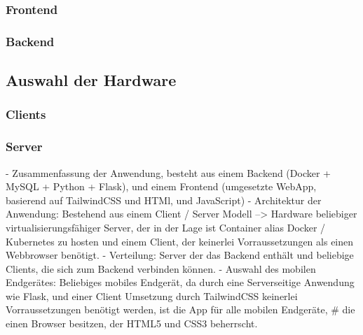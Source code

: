 \subsubsection{Frontend}
\label{sec:frontend}
\subsubsection{Backend}
\label{sec:backend}

\subsection{Auswahl der Hardware}
\subsubsection{Clients}
\subsubsection{Server}

- Zusammenfassung der Anwendung, besteht aus einem Backend (Docker + MySQL + Python + Flask), und einem Frontend
  (umgesetzte WebApp, basierend auf TailwindCSS und HTMl, und JavaScript)
- Architektur der Anwendung: Bestehend aus einem Client / Server Modell --> Hardware beliebiger virtualisierungsfähiger 
  Server, der in der Lage ist Container alias Docker / Kubernetes  zu hosten und einem Client, der keinerlei Vorraussetzungen 
  als einen Webbrowser benötigt.
- Verteilung: Server der das Backend enthält und beliebige Clients, die sich zum Backend verbinden können.
- Auswahl des mobilen Endgerätes: Beliebiges mobiles Endgerät, da durch eine Serverseitige Anwendung wie Flask, und einer 
  Client Umsetzung durch TailwindCSS keinerlei Vorraussetzungen benötigt werden, ist die App für alle mobilen Endgeräte, #
  die einen Browser besitzen, der HTML5 und CSS3 beherrscht.

  